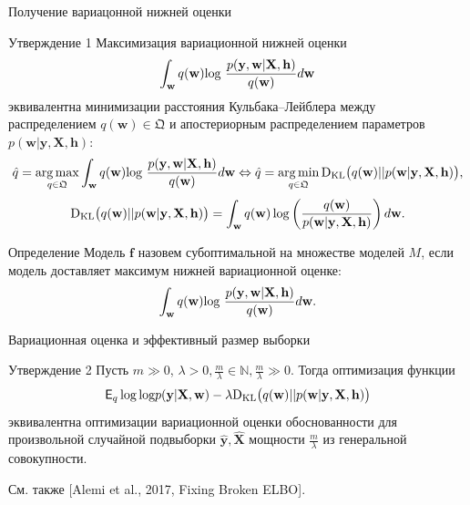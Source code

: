 \documentclass[usenames,dvipsnames,10pt,pdf,utf8,russian,aspectratio=43]{beamer}
\DeclareMathOperator*{\argmax}{arg\,max}
\DeclareMathOperator*{\argmin}{arg\,min}
\begin{document}
\begin{frame}{Получение вариацонной нижней оценки}
\small
\begin{block}{Утверждение 1} Максимизация вариационной нижней оценки $$\int_{\mathbf{w}} q(\mathbf{w})\textnormal{log}~\frac{p(\mathbf{y},\mathbf{w}|\mathbf{X},\mathbf{h})}{q(\mathbf{w})}d\mathbf{w}$$   эквивалентна минимизации расстояния Кульбака--Лейблера между распределением $q(\mathbf{w}) \in \mathfrak{Q}$ и апостериорным распределением параметров $p(\mathbf{w}|\mathbf{y}, \mathbf{X}, \mathbf{h})$:
\[
    \hat{q} = \argmax_{q \in \mathfrak{Q}} \int_{\mathbf{w}} q(\mathbf{w})\textnormal{log}~\frac{p(\mathbf{y},\mathbf{w}|\mathbf{X},\mathbf{h})}{q(\mathbf{w})}d\mathbf{w} \Leftrightarrow 	
    \hat{q} = \argmin_{q \in  \mathfrak{Q}} \textnormal{D}_\textnormal{KL}  \bigl(q(\mathbf{w})||p(\mathbf{w}|\mathbf{y}, \mathbf{X}, \mathbf{h})\bigr),
\]
\[
	\textnormal{D}_\textnormal{KL}  \bigl(q(\mathbf{w})||p(\mathbf{w}|\mathbf{y}, \mathbf{X}, \mathbf{h})\bigr) =  \int_\mathbf{w} q(\mathbf{w}) \log \left(\frac{q(\mathbf{w})}{p(\mathbf{w}|\mathbf{y}, \mathbf{X}, \mathbf{h})}\right) d\mathbf{w}.
\]

\end{block}


\begin{block}{Определение} Модель $\mathbf{f}$ назовем субоптимальной на множестве моделей $M$, если модель доставляет максимум нижней вариационной оценке:
\[
 \int_{\mathbf{w}} q(\mathbf{w})\textnormal{log}~\frac{p(\mathbf{y},\mathbf{w}|\mathbf{X},{\mathbf{h})}}{q(\mathbf{w})}d\mathbf{w}.
\]
\end{block}


\end{frame}

\begin{frame}{Вариационная оценка и эффективный размер выборки}
\begin{block}{Утверждение 2}
Пусть $m \gg 0$, $\lambda > 0, \frac{m}{\lambda}   \in \mathbb{N}, \frac{m}{\lambda}  \gg 0.$ Тогда оптимизация функции
\[
\mathsf{E}_{q} \log \text{log} p(\mathbf{y}|\mathbf{X}, \mathbf{w}) - \lambda \textnormal{D}_\textnormal{KL}  \bigl(q(\mathbf{w})||p(\mathbf{w}|\mathbf{y}, \mathbf{X}, \mathbf{h})\bigr)
\]
 эквивалентна оптимизации вариационной оценки обоснованности  
для произвольной случайной подвыборки $\hat{\mathbf{y}}, \hat{\mathbf{X}}$ мощности $\frac{m}{{\lambda}}$ из генеральной совокупности.
\end{block}

См. также [Alemi et al., 2017, Fixing Broken ELBO].
\end{frame}
\end{document}
